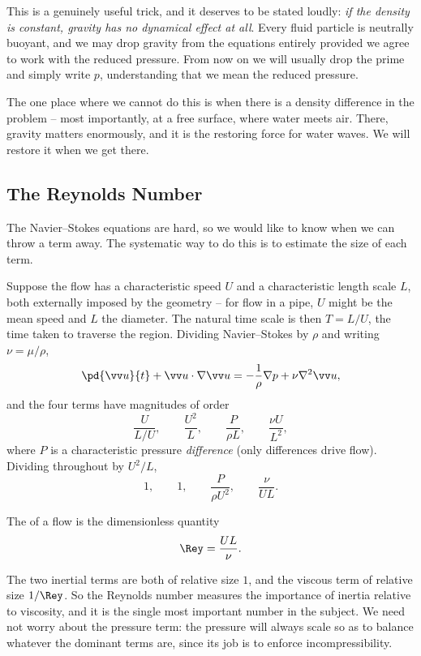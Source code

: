 This is a genuinely useful trick, and it deserves to be stated loudly: \emph{if the density is constant, gravity has no dynamical effect at all}. Every fluid particle is neutrally buoyant, and we may drop gravity from the equations entirely provided we agree to work with the reduced pressure. From now on we will usually drop the prime and simply write $p$, understanding that we mean the reduced pressure.

The one place where we cannot do this is when there is a density difference in the problem -- most importantly, at a free surface, where water meets air. There, gravity matters enormously, and it is the restoring force for water waves. We will restore it when we get there.

\subsection{The Reynolds Number}

The Navier--Stokes equations are hard, so we would like to know when we can throw a term away. The systematic way to do this is to estimate the size of each term.

Suppose the flow has a characteristic speed $U$ and a characteristic length scale $L$, both externally imposed by the geometry -- for flow in a pipe, $U$ might be the mean speed and $L$ the diameter. The natural time scale is then $T = L/U$, the time taken to traverse the region. Dividing Navier--Stokes by $\rho$ and writing $\nu = \mu/\rho$,
$$
\pd{\vv u}{t} + \vv u \cdot \nabla \vv u = -\frac{1}{\rho}\nabla p + \nu \nabla^2 \vv u,
$$
and the four terms have magnitudes of order
$$
\frac{U}{L/U}, \qquad \frac{U^2}{L}, \qquad \frac{P}{\rho L}, \qquad \frac{\nu U}{L^2},
$$
where $P$ is a characteristic pressure \emph{difference} (only differences drive flow). Dividing throughout by $U^2/L$,
$$
1, \qquad 1, \qquad \frac{P}{\rho U^2}, \qquad \frac{\nu}{UL}.
$$

\begin{definition}
	The  of a flow is the dimensionless quantity
	$$
	\Rey = \frac{UL}{\nu}.
	$$
\end{definition}

The two inertial terms are both of relative size $1$, and the viscous term of relative size $1/\Rey$. So the Reynolds number measures the importance of inertia relative to viscosity, and it is the single most important number in the subject. We need not worry about the pressure term: the pressure will always scale so as to balance whatever the dominant terms are, since its job is to enforce incompressibility.

